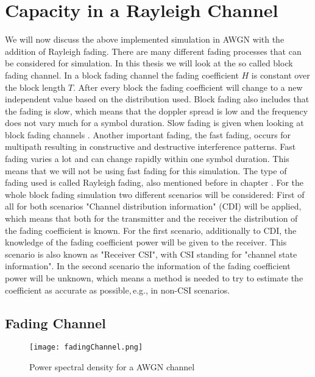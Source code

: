 \chapter{Capacity in a Rayleigh Channel} 
\label{chap:raychan}
\graphicspath{{C:/Users/Kevin/Bachelarbeit/Bachelorarbeit/01_Bachelorarbeit_LaTex/02_Figures/}}


We will now discuss the above implemented simulation in AWGN with the addition of Rayleigh fading. 
There are many different fading processes that can be considered for simulation. In this thesis we will look at the so called block fading channel. In a block fading channel the fading coefficient $H$ is constant over the block length $T$. After every block the fading coefficient will change to a new independent value based on the distribution used. Block fading also includes that the fading is slow, which means that the doppler spread is low and the frequency does not vary much for a symbol duration. Slow fading is given when looking at block fading channels \cite[p.~102]{Goldsmith08}. Another important fading, the fast fading, occurs for multipath resulting in constructive and destructive interference patterns. Fast fading varies a lot and can change rapidly within one symbol duration. This means that we will not be using fast fading for this simulation.
The type of fading used is called Rayleigh fading, also mentioned before in chapter . For the whole block fading simulation two different scenarios will be considered:
\newline
First of all for both scenarios "Channel distribution information" (CDI) will be applied, which means that both for the transmitter and the receiver the distribution of the fading coefficient is known. For the first scenario, additionally to CDI, the knowledge of the fading coefficient power will be given to the receiver. This scenario is also known as "Receiver CSI", with CSI standing for "channel state information".
\newline
In the second scenario the information of the fading coefficient power will be unknown, which means a method is needed to try to estimate the coefficient as accurate as possible,\,e.g., in non-CSI scenarios. 
\clearpage 
\section{Fading Channel}
\begin{figure}[!htb]
	\centering
	\texttt{[image: fadingChannel.png]}
	\caption{Power spectral density for a AWGN channel}
	\label{fig:AWGN}
\end{figure}

